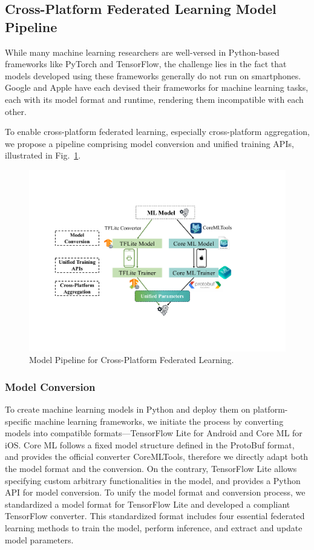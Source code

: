 \subsection{Cross-Platform Federated Learning Model Pipeline}
\label{sec:pipeline}

While many machine learning researchers are well-versed in Python-based
frameworks like PyTorch and TensorFlow,
the challenge lies in the fact that models developed using these frameworks
generally do not run on smartphones.
Google and Apple have each devised their frameworks for machine learning tasks,
each with its model format and runtime,
rendering them incompatible with each other.

To enable cross-platform federated learning,
especially cross-platform aggregation,
we propose a pipeline comprising model conversion and unified training APIs,
illustrated in Fig.~\ref{fig:pipeline}.

\begin{figure}\begin{center}
    \includegraphics[width=\linewidth]{model_pipeline.pdf}
    \caption{\fedkit Model Pipeline for Cross-Platform Federated Learning.}
    \label{fig:pipeline}
\end{center}\end{figure}

\subsubsection{Model Conversion}
To create machine learning models in Python and deploy them on platform-specific
machine learning frameworks,
we initiate the process by converting models into compatible
formats---TensorFlow Lite for Android and Core ML for iOS.
Core ML follows a fixed model structure defined in the ProtoBuf format,
and provides the official converter CoreMLTools,
therefore we directly adapt both the model format and the conversion.
On the contrary,
TensorFlow Lite allows specifying custom arbitrary functionalities in the model,
and provides a Python API for model conversion.
To unify the model format and conversion process,
we standardized a model format for TensorFlow Lite and developed a compliant
TensorFlow converter.
This standardized format includes four essential federated learning methods to
train the model, perform inference, and extract and update model parameters.

